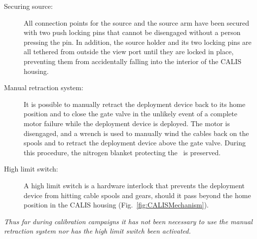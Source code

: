 \begin{description}
\item[Securing source:] 
All connection points for the source and the source arm have been secured with two push locking pins that cannot be disengaged without a person pressing the pin. In addition, the source holder and its two locking pins are all tethered from outside the view port until they are locked in place, preventing them from accidentally falling into the interior of the CALIS housing.

\item[Manual retraction system:]
It is possible to manually retract the deployment device back to its home position and to close the gate valve in the unlikely event of a complete motor failure while the deployment device is deployed. The motor is disengaged, and a wrench is used to manually wind the cables back on the spools and to retract the deployment device above the gate valve. During this procedure, the nitrogen blanket protecting the \lsv\ is preserved. 
   
\item[High limit switch:]
A high limit switch is a hardware interlock that prevents the deployment device from hitting cable spools and gears, should it pass beyond the home position in the CALIS housing (Fig.~\ref{fig:CALISMechanism}). 
\end{description}

\textit{Thus far during calibration campaigns it has not been necessary to use the manual retraction system nor has the high limit switch been activated.}

	
